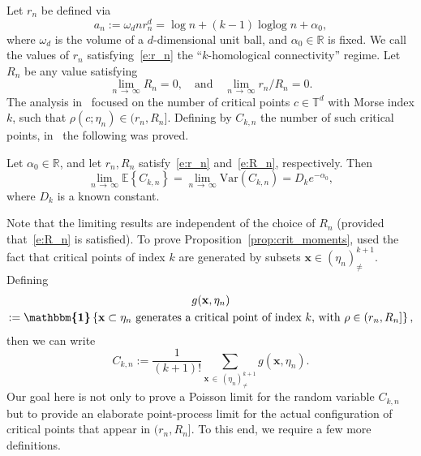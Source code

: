 \documentclass[AHL,Unicode,longabstracts]{cedram}
\DeclareMathOperator{\logg}{\log\log}
\newcommand{\bx}{\mathbf{x}}
\newcommand*\R{\mathbb{R}}
\newcommand*\T{\mathbb{T}}
\newcommand{\E}{\mathbb{E}}
\newcommand{\mean}[1] {\E\left\{{#1}\right\}}
\newcommand{\ind}{\boldsymbol{\mathbbm{1}}}
\newcommand{\var}[1]{\mathrm{Var}\param{{#1}}}
\newcommand{\param}[1]{\left(#1\right)}
\newcommand{\ninf}{n\,\to\,\infty}
\newcommand{\limninf}{\lim_{\ninf}}
\begin{document}
Let $r_n$ be defined via
\begin{equation}\label{e:r_n}
a_n := \omega_d nr_n^d = \log n + (k-1)\logg n + \alpha_0,
\end{equation}
where $\omega_d$ is the volume of a $d$-dimensional unit ball, and $\alpha_0\in \R$ is fixed. We call the values of $r_n$ satisfying~\eqref{e:r_n} the ``$k$-homological connectivity'' regime. Let $R_n$ be any value satisfying
\begin{equation}\label{e:R_n}
\limninf R_n =0,\quad\text{and}\quad\limninf r_n/R_n = 0.
\end{equation} The analysis in~\cite{Bobrowski2019} focused on the number of critical points $c\in \T^d$ with Morse index $k$, such that $\rho(c;\eta_n) \in (r_n,R_n]$. Defining by $C_{k,n}$ the number of such critical points, in~\cite[Proposition~4.1]{Bobrowski2019} the following was proved.

\begin{prop}\label{prop:crit_moments}
Let $\alpha_0 \in \R$, and let $r_n,R_n$ satisfy~\eqref{e:r_n} and~\eqref{e:R_n}, respectively. Then
\[
\limninf \mean{C_{k,n}} = \limninf \var{C_{k,n}} = D_k e^{-\alpha_0},
\]
where $D_k$ is a known constant.
\end{prop}

Note that the limiting results are independent of the choice of $R_n$ (provided that~\eqref{e:R_n} is satisfied). To prove Proposition~\ref{prop:crit_moments}, \cite{Bobrowski2019} used the fact that critical points of index $k$ are generated by subsets $\bx\in(\eta_n)^{k+1}_{\ne}$. Defining
\begin{multline}\label{e:g_rR}
g(\bx, \eta_n) \\
:= \ind\left\{\bx\subset \eta_n\text{ generates a critical point of index $k$, with }\rho\in (r_n,R_n]\right\},
\end{multline}
then we can write
\[
C_{k,n} := \frac{1}{(k+1)!} \sum_{\bx\,\in\,\left(\eta_n\right)^{k+1}_{\ne}} g\left(\bx,\eta_n\right).
\]
Our goal here is not only to prove a Poisson limit for the random variable $C_{k,n}$ but to provide an elaborate point-process limit for the actual configuration of critical points that appear in $(r_n,R_n]$. To this end, we require a few more definitions.
\end{document}
